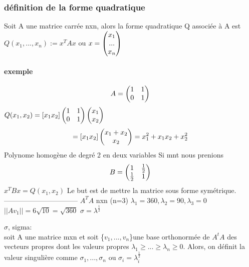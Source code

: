 \documentclass[a4paper,10pt]{article}
\begin{document}
\subsubsection{définition de la forme quadratique}
Soit  A une matrice carrée nxn, alors la forme quadratique Q associée à A est $Q(x_1,...,x_n):=x^TAx$ ou $x=\begin{pmatrix}
                                                                                                             x_1\cr
                                                                                                             ...\cr
                                                                                                             x_n\cr
                                                                                                            \end{pmatrix}
$
\paragraph{exemple}
\[
A=\begin{pmatrix}
   1&1\cr
   0&1\cr
  \end{pmatrix}
\]
\newline
$Q(x_1,x_2)=[x_1 x_2]\begin{pmatrix}
                      1&1\cr
                      0&1\cr
                     \end{pmatrix}
\begin{pmatrix}
 x_1\cr
 x_2\cr
\end{pmatrix}
$
\newline
\[
=[x_1x_2]\begin{pmatrix}
          x_1+x_2\cr
          x_2\cr
         \end{pmatrix}
=x_1^2+x_1x_2+x_2^2
\]
\newline
Polynome homogène de degré 2 en deux variables
\newline
Si mnt nous prenions
\newline
\[
B=\begin{pmatrix}
   1&\frac{1}{2}\cr
   \frac{1}{2}&1\cr
  \end{pmatrix}
\]
\newline
$x^TBx=Q(x_1,x_2)$
\newline
Le but est de mettre la matrice sous forme symétrique.
\newline
--------------------------------
\newline
$A^TA$ nxn (n=3)
\newline
$\lambda_1=360,\lambda_2=90,\lambda_3=0$
\newline
$||Av_1||=6\sqrt{10}=\sqrt{360}$
\newline
$\sigma=\lambda^{\frac{1}{2}}$
\begin{description}
 \item $\sigma$, sigma:\\{soit A une matrice mxn et soit \{$v_1,...,v_n$\}une base orthonormée de $A^tA$ des vecteurs propres dont les valeurs propres $\lambda_1\geq...\geq\lambda_n\geq 0$. Alors, on définit la valeur singulière comme $\sigma_1,...,\sigma_n$ ou $\sigma_i= \lambda_i^{\frac{1}{2}}$}
\end{description}
\end{document}
